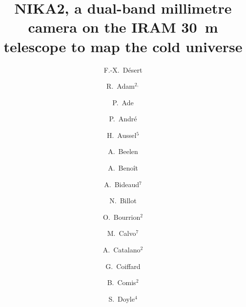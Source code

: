 \documentclass{sf2a-conf2016}
\begin{document}


\title{NIKA2, a dual-band millimetre camera on the IRAM 30~m telescope to map the cold universe }






\author{F.-X.~D\'esert} \address{Institut de Plan\'etologie et d'Astrophysique
  de Grenoble, Univ. Grenoble Alpes, CNRS, IPAG, F-38000 France}

\author{R.~Adam$^{2,} $} \address{Laboratoire de Physique Subatomique et de
  Cosmologie, Universit\'e Grenoble Alpes, CNRS/IN2P3, 53, avenue des Martyrs,
  Grenoble, France} \address{Laboratoire Lagrange, Universit\'e C\^ote d'Azur,
  Observatoire de la C\^ote d'Azur, CNRS, Blvd de l'Observatoire, CS 34229,
  06304 Nice cedex 4, France}

\author{P.~Ade} \address{Astronomy Instrumentation Group, University of Cardiff,
  UK} %

\author{ P.~Andr\'e} \address{Laboratoire AIM, CEA/IRFU, CNRS/INSU,
    Universit\'e Paris Diderot, CEA-Saclay, 91191 Gif-Sur-Yvette,
    France} %

\author{ H.~Aussel$^{5} $}

\author{  A.~Beelen} \address{Institut d'Astrophysique Spatiale (IAS), CNRS
  and Universit\'e Paris Sud, Orsay, France} %

\author{  A.~Beno\^it} \address{Institut N\'eel, CNRS and Universit\'e
  Grenoble Alpes, France} %

\author{  A.~Bideaud$^{7}$}

\author{ N.~Billot} \address{Institut de RadioAstronomie Millim\'etrique
  (IRAM), Granada, Spain} %

\author{  O.~Bourrion$^{2}$}

\author{  M.~Calvo$^{7}$} 

\author{  A.~Catalano$^{2}$}

\author{  G.~Coiffard} \address{Institut de RadioAstronomie Millim\'etrique
  (IRAM), Grenoble, France} %

\author{  B.~Comis$^{2}$} 

\author{  S.~Doyle$^{4}$}
\end{document}
